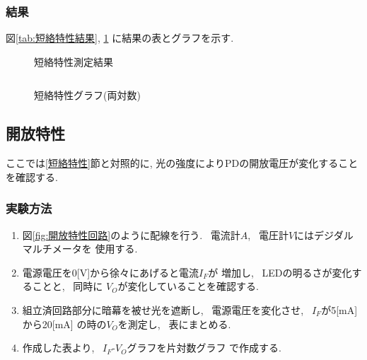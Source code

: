 \documentclass[titlepage]{jsarticle}
\begin{document}
        \subsubsection{結果}
            図\ref{tab:短絡特性結果}, \ref{fig:短絡特性グラフ}
            に結果の表とグラフを示す.

            \begin{figure}[ht]
                \def\@captype{table}
                \begin{minipage}{0.5\hsize}
                    \begin{center}
                        \caption{短絡特性測定結果}
                        \label{tab:短絡特性結果}
                        \begin{tabular}{c|c}
                            
                        \end{tabular}
                    \end{center}
                \end{minipage}
                \begin{minipage}{0.5\hsize}
                    \begin{center}
                        \caption{短絡特性グラフ(両対数)}
                        \label{fig:短絡特性グラフ}
                    \end{center}
                \end{minipage}
            \end{figure}

    \subsection{開放特性}
        ここでは\ref{短絡特性}節と対照的に,
        光の強度によりPDの開放電圧が変化することを確認する.
            
        \subsubsection{実験方法}
            \begin{enumerate}
                \item 図\ref{fig:開放特性回路}のように配線を行う.
                    ~電流計$A$, ~電圧計$V$にはデジダルマルチメータを
                    使用する.
                \item 電源電圧を0[V]から徐々にあげると電流$I_F$が
                    増加し, ~LEDの明るさが変化することと, ~同時に
                    $V_O$が変化していることを確認する.
                \item 組立済回路部分に暗幕を被せ光を遮断し,
                    ~電源電圧を変化させ, ~$I_F$が5[mA]から20[mA]
                    の時の$V_O$を測定し, ~表にまとめる.
                \item 作成した表より, ~$I_F$-$V_O$グラフを片対数グラフ
                    で作成する.
            \end{enumerate}
\end{document}
